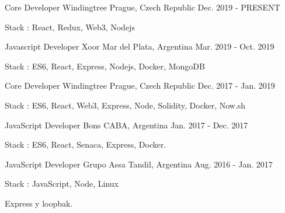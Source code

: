 


\begin{cventries}

\cventry
{Core Developer} %
{Windingtree} %
{Prague, Czech Republic} %
{Dec. 2019 - PRESENT} %
{ %
\begin{cvitems}
\item {Stack : React, Redux, Web3, Nodejs}
\end{cvitems}
}
\cventry
{Javascript Developer} %
{Xoor} %
{Mar del Plata, Argentina} %
{Mar. 2019 - Oct. 2019} %
{ %
\begin{cvitems}
\item {Stack : ES6, React, Express, Nodejs, Docker, MongoDB}
\end{cvitems}
}
\cventry
{Core Developer} %
{Windingtree} %
{Prague, Czech Republic} %
{Dec. 2017 - Jan. 2019} %
{ %
\begin{cvitems}
\item {Stack : ES6, React, Web3, Express, Node, Solidity, Docker, Now.sh}
\end{cvitems}
}
\cventry
{ JavaScript Developer} %
{Bons} %
{CABA, Argentina} %
{Jan. 2017 - Dec. 2017} %
{ %
\begin{cvitems}
\item {Stack : ES6, React, Senaca, Express, Docker.}
\end{cvitems}
}
\cventry
{ JavaScript Developer} %
{Grupo Assa} %
{Tandil, Argentina} %
{Aug. 2016 - Jan. 2017} %
{ %
\begin{cvitems}
\item {Stack : JavaScript, Node, Linux}
\item {Express y loopbak.}
\end{cvitems}
}


\end{cventries}
